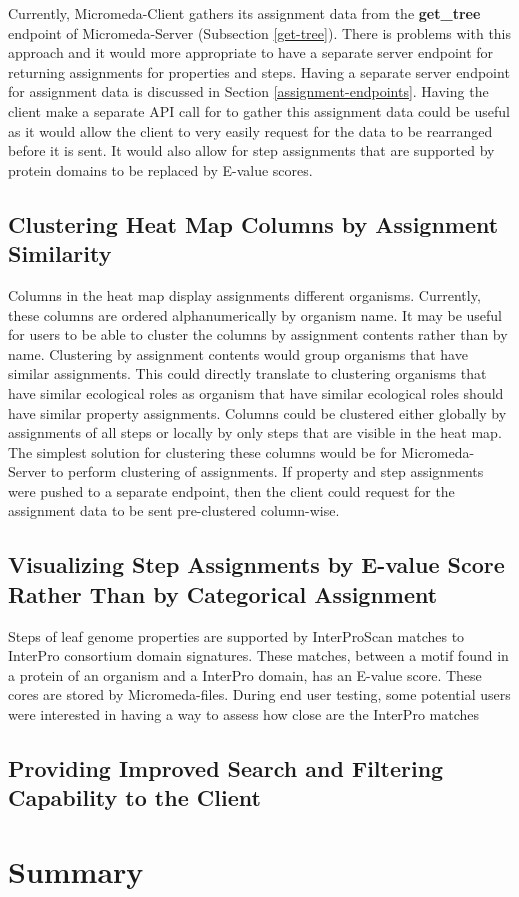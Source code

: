 Currently, Micromeda-Client gathers its assignment data from the \textbf{get\_tree} endpoint of Micromeda-Server (Subsection \ref{get-tree}). There is problems with this approach and it would more appropriate to have a separate server endpoint for returning assignments for properties and steps. Having a separate server endpoint for assignment data is discussed in Section \ref{assignment-endpoints}. Having the client make a separate API call for to gather this assignment data could be useful as it would allow the client to very easily request for the data to be rearranged before it is sent. It would also allow for step assignments that are supported by protein domains to be replaced by E-value scores.

\subsection{Clustering Heat Map Columns by Assignment Similarity}

Columns in the heat map display assignments different organisms. Currently, these columns are ordered alphanumerically by organism name. It may be useful for users to be able to cluster the columns by assignment contents rather than by name. Clustering by assignment contents would group organisms that have similar assignments. This could directly translate to clustering organisms that have similar ecological roles as organism that have similar ecological roles should have similar property assignments. Columns could be clustered either globally by assignments of all steps or locally by only steps that are visible in the heat map. The simplest solution for clustering these columns would be for Micromeda-Server to perform clustering of assignments. If property and step assignments were pushed to a separate endpoint, then the client could request for the assignment data to be sent pre-clustered column-wise.

\subsection{Visualizing Step Assignments by E-value Score Rather Than by Categorical Assignment}

Steps of leaf genome properties are supported by InterProScan matches to InterPro consortium domain signatures. These matches, between a motif found in a protein of an organism and a InterPro domain, has an E-value score. These cores are stored by Micromeda-files. During end user testing, some potential users were interested in having a way to assess how close are the InterPro matches 

\subsection{Providing Improved Search and Filtering Capability to the Client}

\section{Summary} 